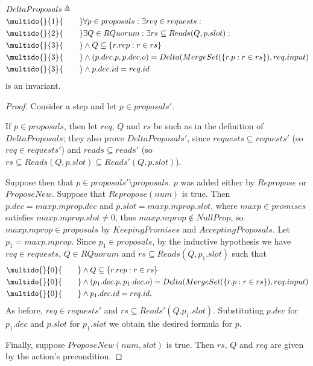 \documentclass[12pt,a4paper,en]{pracamgr}
\newcommand{\ind}[1]{\multido{}{#1}{\qquad}}
\begin{document}
\begin{lemma}
    \begin{align*}
        & DeltaProposals \triangleq \\
        & \ind{1} \forall p \in proposals: \exists req \in requests:\\
        & \ind{2} \exists Q \in RQuorum: \exists rs \subseteq Reads(Q, p.slot):\\
        & \ind{3} \land Q \subseteq \{r.rep: r \in rs\}\\
        & \ind{3} \land (p.dec.p, p.dec.o) = Delta(MergeSet(\{r.p: r \in rs\}), req.input)\\
        & \ind{3} \land p.dec.id = req.id
    \end{align*}
    is an invariant.
\end{lemma}
\begin{proof}
    Consider a step and let $p \in proposals'$.

    If $p \in proposals$, then let $req$, $Q$ and $rs$ be such as in the definition of $DeltaProposals$; they also prove $DeltaProposals'$, since $requests \subseteq requests'$ (so $req \in requests'$) and $reads \subseteq reads'$ (so $rs \subseteq Reads(Q, p.slot) \subseteq Reads'(Q, p.slot)$).

    Suppose then that $p \in proposals' \setminus proposals$. $p$ was added either by $Repropose$ or $ProposeNew$. Suppose that $Repropose(num)$ is true. Then $p.dec = maxp.mprop.dec$ and $p.slot = maxp.mprop.slot$, where $maxp \in promises$ satisfies $maxp.mprop.slot \neq 0$, thus $maxp.mprop \notin NullProp$, so $maxp.mprop \in proposals$ by $KeepingPromises$ and $AcceptingProposals$. Let $p_1 = maxp.mprop$. Since $p_1 \in proposals$, by the inductive hypothesis we have $req \in requests$, $Q \in RQuorum$ and $rs \subseteq Reads(Q, p_1.slot)$ such that
    \begin{align*}
        & \ind{0} \land Q \subseteq \{r.rep: r \in rs\}\\
        & \ind{0} \land (p_1.dec.p, p_1.dec.o) = Delta(MergeSet(\{r.p: r \in rs\}), req.input)\\
        & \ind{0} \land p_1.dec.id = req.id.
    \end{align*}
    As before, $req \in requests'$ and $rs \subseteq Reads'(Q.p_1.slot)$. Substituting $p.dec$ for $p_1.dec$ and $p.slot$ for $p_1.slot$ we obtain the desired formula for $p$.

    Finally, suppose $ProposeNew(num, slot)$ is true. Then $rs$, $Q$ and $req$ are given by the action's precondition.
\end{proof}
\end{document}
